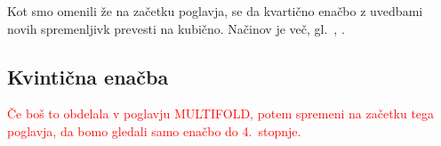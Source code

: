 Kot smo omenili že na začetku poglavja, se da kvartično enačbo z uvedbami novih spremenljivk prevesti na kubično. Načinov je več, gl.\ \cite{wikiquartic}, \cite{quartics2012}.


\subsection{Kvintična enačba}

\textcolor{red}{Če boš to obdelala v poglavju MULTIFOLD, potem spremeni na začetku tega poglavja, da bomo gledali samo enačbo do 4.\ stopnje.}